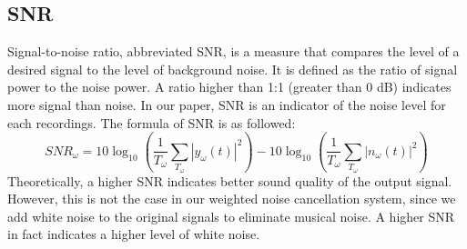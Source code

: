 \documentclass[journal]{IEEEtran}
\begin{document}
\subsection{SNR}
\begin{flushleft}
Signal-to-noise ratio, abbreviated SNR, is a measure that compares the level of a desired signal to the level of background noise. It is defined as the ratio of signal power to the noise power. A ratio higher than 1:1 (greater than 0 dB) indicates more signal than noise. In our paper, SNR is an indicator of the noise level for each recordings. The formula of SNR is as followed:
\begin{equation}
SNR_\omega = 10\log_{10}(\frac{1}{T_\omega}\sum_{T_\omega} |y_\omega(t)|^2) - 10\log_{10}(\frac{1}{T_\omega}\sum_{T_\omega} |n_\omega(t)|^2)
\end{equation}
Theoretically, a higher SNR indicates better sound quality of the output signal. However, this is not the case in our weighted noise cancellation system, since we add white noise to the original signals to eliminate musical noise. A higher SNR in fact indicates a higher level of white noise. 
\end{flushleft}


%
%

\end{document}
